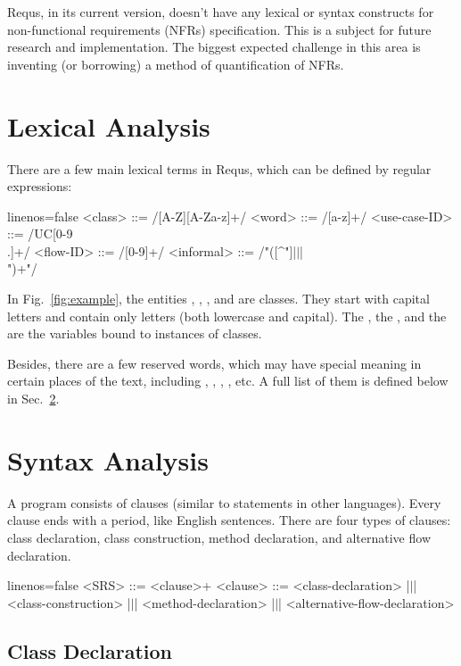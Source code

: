\documentclass[sigplan,10pt,nonacm=true]{acmart}
\begin{document}
Requs, in its current version, doesn't have any lexical or syntax constructs
for non-functional requirements (NFRs) specification. This is a subject for
future research and implementation. The biggest expected challenge in this area is
inventing (or borrowing) a method of quantification of NFRs.

\section{Lexical Analysis}
\label{sec:lexical}

There are a few main lexical terms in Requs, which can be
defined by regular expressions:

\begin{ffcode*}{linenos=false}
<class> ::= /[A-Z][A-Za-z]+/
<word> ::= /[a-z]+/
<use-case-ID> ::= /UC[0-9\\.]+/
<flow-ID> ::= /[0-9]+/
<informal> ::= /"([^"]|$\vert$|\\")+"/
\end{ffcode*}

In Fig.~\ref{fig:example}, the entities , , , and
 are classes. They start with capital letters and contain only
letters (both lowercase and capital). The , the , and
the  are the variables bound to instances of classes.

Besides, there are a few reserved words, which may have special meaning in
certain places of the text, including , , ,
, etc.
A full list of them is defined below in Sec.~\ref{sec:syntax}.

\section{Syntax Analysis}
\label{sec:syntax}

A program consists of clauses (similar to statements in other
languages). Every clause ends with a period, like English sentences. There
are four types of clauses: class declaration, class construction, method
declaration, and alternative flow declaration.

\begin{ffcode*}{linenos=false}
<SRS> ::= <clause>+
<clause> ::= <class-declaration>
  |$\vert$| <class-construction>
  |$\vert$| <method-declaration>
  |$\vert$| <alternative-flow-declaration>
\end{ffcode*}

\subsection{Class Declaration}
\end{document}
